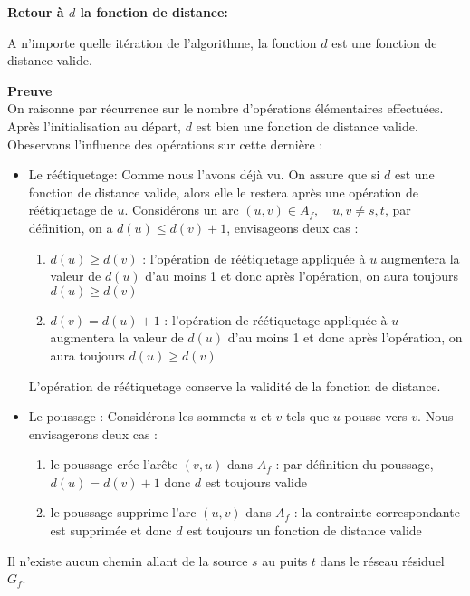 \textbf{Retour à $d$ la fonction de distance:}\\
\begin{lemma}
	\label{residual_path}
	A n'importe quelle itération de l'algorithme, la fonction $d$ est une fonction de distance valide.
\end{lemma}  
\textbf{Preuve} \\
  On raisonne par récurrence sur le nombre d'opérations élémentaires effectuées.
  Après l'initialisation au départ, $d$ est bien une fonction de distance valide.\\

	Obeservons l'influence des opérations sur cette dernière :\begin{itemize}
  
  \item Le réétiquetage:
  Comme nous l'avons déjà vu.
  On assure que si $d$ est une fonction de distance valide, alors elle le restera après une opération de réétiquetage de $u$.
	Considérons un arc $(u,v) \in A_f, \quad u, v \not = s, t$, par définition, on a $d(u) \leq d(v) + 1$, envisageons deux
	cas : \begin{enumerate}
	\item $d(u) \geq d(v)$ : l'opération de réétiquetage appliquée à $u$ augmentera la valeur de
	$d(u)$ d'au moins 1 et donc après l'opération, on aura toujours $d(u) \geq d(v)$
	\item $d(v) = d(u) + 1$ : l'opération de réétiquetage appliquée à $u$ augmentera la valeur de
	$d(u)$ d'au moins 1 et donc après l'opération, on aura toujours $d(u) \geq d(v)$
	\end{enumerate}
	L'opération de réétiquetage conserve la validité de la fonction de distance.
  
	\item Le poussage :
	Considérons les sommets $u$ et $v$ tels que $u$ pousse vers $v$. Nous envisagerons deux cas :
	\begin{enumerate}
	\item le poussage crée l'arête $(v,u)$ dans $A_f$ : par définition du poussage, $d(u) = d(v) + 1$
	donc $d$ est toujours valide
	\item le poussage supprime l'arc $(u,v)$ dans $A_f$ : la contrainte correspondante est supprimée
	et donc $d$ est toujours un fonction de distance valide
	\end{enumerate}
	\end{itemize}
 
\begin{lemma}
	\label{borne_reetiq}Il n'existe aucun chemin allant de la source $s$ au puits $t$ dans le réseau résiduel $G_f$.
\end{lemma} 

